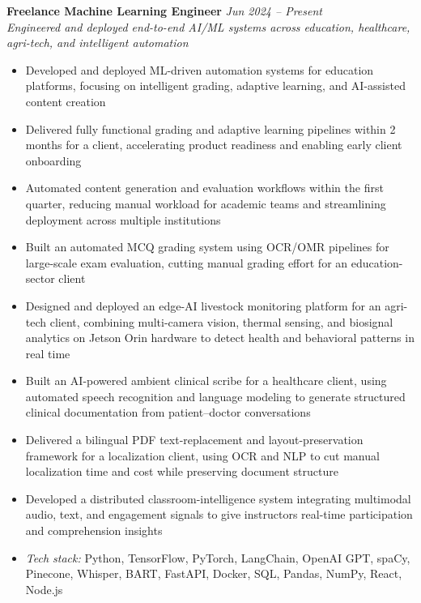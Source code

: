 \documentclass[11pt,a4paper]{article}
\newcommand{\entry}[4]{%
  \noindent\textbf{#1} \hfill \textit{#2}\\
  \textit{#3} \hfill #4\\[2pt]
}
\begin{document}
\entry{Freelance Machine Learning Engineer}{Jun 2024 -- Present}
      {Engineered and deployed end-to-end AI/ML systems across education, healthcare, agri-tech, and intelligent automation}{}
\begin{itemize}
    \item Developed and deployed ML-driven automation systems for education platforms, focusing on
          intelligent grading, adaptive learning, and AI-assisted content creation
    \item Delivered fully functional grading and adaptive learning pipelines within 2 months for a
          client, accelerating product readiness and enabling early client onboarding
    \item Automated content generation and evaluation workflows within the first quarter, reducing
          manual workload for academic teams and streamlining deployment across multiple institutions
    \item Built an automated MCQ grading system using OCR/OMR pipelines for large-scale exam
          evaluation, cutting manual grading effort for an education-sector client
    \item Designed and deployed an edge-AI livestock monitoring platform for an agri-tech client,
          combining multi-camera vision, thermal sensing, and biosignal analytics on Jetson Orin
          hardware to detect health and behavioral patterns in real time
    \item Built an AI-powered ambient clinical scribe for a healthcare client, using automated speech
          recognition and language modeling to generate structured clinical documentation from
          patient--doctor conversations
    \item Delivered a bilingual PDF text-replacement and layout-preservation framework for a
          localization client, using OCR and NLP to cut manual localization time and cost while
          preserving document structure
    \item Developed a distributed classroom-intelligence system integrating multimodal audio, text,
          and engagement signals to give instructors real-time participation and comprehension
          insights
    \item \textit{Tech stack:} Python, TensorFlow, PyTorch, LangChain, OpenAI GPT, spaCy, Pinecone,
          Whisper, BART, FastAPI, Docker, SQL, Pandas, NumPy, React, Node.js
\end{itemize}
\end{document}
